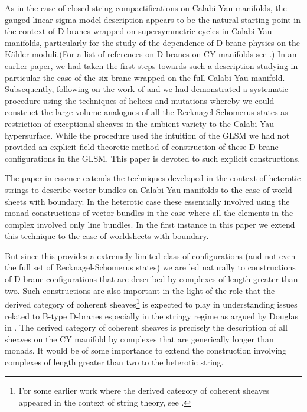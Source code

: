 \documentclass[a4paper,12pt]{article}
\begin{document}
As in the case of closed string compactifications on Calabi-Yau
manifolds, the gauged linear sigma model description 
appears to be the natural starting point 
in the context of
D-branes wrapped on supersymmetric cycles in Calabi-Yau manifolds,
particularly for the study of the
dependence of D-brane physics on the K\"ahler moduli.(For 
a list of references on D-branes on CY manifolds see
\cite{RS,quintic,dgepner,oops}.) In an
earlier paper\cite{lsmone}, we had taken the first steps towards such a
description studying in particular the case of the six-brane wrapped on
the full Calabi-Yau manifold. Subsequently, following on the 
work of
\cite{diacgom} and \cite{dougdiac} we had demonstrated a systematic
procedure using the techniques of helices and mutations whereby we could
construct the large volume analogues of all the \coordHE{}
Recknagel-Schomerus states as restriction of 
exceptional sheaves in the ambient variety to the Calabi-Yau
hypersurface\cite{helices}.
While the procedure used the intuition of the GLSM we had
not provided an explicit field-theoretic method of construction of these
D-brane configurations in the GLSM. This paper is devoted to such
explicit constructions. 

The paper in essence extends the techniques developed in the context of
heterotic strings to describe vector bundles on Calabi-Yau manifolds to
the case of world-sheets with boundary. In the heterotic case these
essentially involved using the monad constructions of vector bundles in
the case where all the elements in the complex involved only line
bundles. In the first instance in this paper we extend this technique to
the case of worldsheets with boundary.  

But since this provides a
extremely limited class of configurations (and not even the full set of
Recknagel-Schomerus states) we are led naturally
to constructions of D-brane configurations that are described by
complexes of length greater than two. Such constructions are also
important in the light of the role that the derived category of coherent
sheaves\footnote{For some earlier work where the derived category of coherent
sheaves appeared in the context of string theory, see \cite{cat}.}
is expected to play in understanding issues related to
B-type D-branes especially
in the stringy regime as argued by Douglas in \cite{dougtalk,dougcat}.
The derived category of coherent sheaves is precisely the description of
all sheaves on the CY manifold by complexes that are generically longer
than monads. It would be of some importance to extend the construction
involving complexes of length greater than two to the heterotic string.
\end{document}
